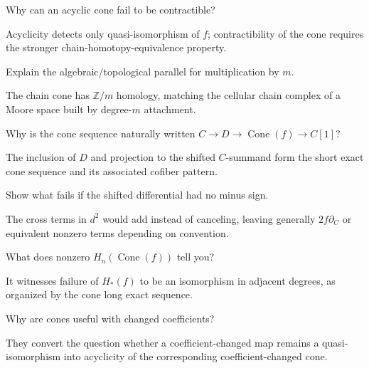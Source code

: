 \begin{problem}\label{prob:viii24-15}
Why can an acyclic cone fail to be contractible?
\end{problem}
\begin{solution}
Acyclicity detects only quasi-isomorphism of \(f\); contractibility of the cone requires the stronger chain-homotopy-equivalence property.
\end{solution}

\begin{problem}\label{prob:viii24-16}
Explain the algebraic/topological parallel for multiplication by \(m\).
\end{problem}
\begin{solution}
The chain cone has \(\mathbb Z/m\) homology, matching the cellular chain complex of a Moore space built by degree-\(m\) attachment.
\end{solution}

\begin{problem}[Triangle]\label{prob:viii24-17}
Why is the cone sequence naturally written \(C\to D\to\operatorname{Cone}(f)\to C[1]\)?
\end{problem}
\begin{solution}
The inclusion of \(D\) and projection to the shifted \(C\)-summand form the short exact cone sequence and its associated cofiber pattern.
\end{solution}

\begin{problem}[Sign]\label{prob:viii24-18}
Show what fails if the shifted differential had no minus sign.
\end{problem}
\begin{solution}
The cross terms in \(d^2\) would add instead of canceling, leaving generally \(2f\partial_C\) or equivalent nonzero terms depending on convention.
\end{solution}

\begin{problem}\label{prob:viii24-19}
What does nonzero \(H_n(\operatorname{Cone}(f))\) tell you?
\end{problem}
\begin{solution}
It witnesses failure of \(H_*(f)\) to be an isomorphism in adjacent degrees, as organized by the cone long exact sequence.
\end{solution}

\begin{problem}\label{prob:viii24-20}
Why are cones useful with changed coefficients?
\end{problem}
\begin{solution}
They convert the question whether a coefficient-changed map remains a quasi-isomorphism into acyclicity of the corresponding coefficient-changed cone.
\end{solution}

